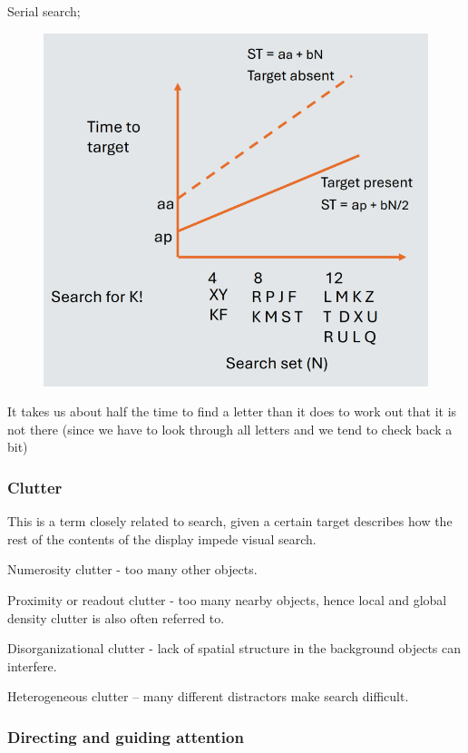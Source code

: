 \documentclass[]{project_plan}
\begin{document}
Serial search;
\begin{figure}[h!]
  \centering
  \includegraphics[width=\linewidth]{serial_search_absent_present_target.png}
\end{figure}

It takes us about half the time to find a letter than it does to work out
that it is not there (since we have to look through all letters and we
tend to check back a bit)

\subsubsection{Clutter}
This is a term closely related to search, given a certain target describes how
the rest of the contents of the display impede visual search.

Numerosity clutter - too many other objects.

Proximity or readout clutter - too many nearby objects, hence local and global
density clutter is also often referred to.

Disorganizational clutter - lack of spatial structure in the background objects
can interfere.

Heterogeneous clutter – many different distractors make search difficult.

\subsubsection{Directing and guiding attention}
\end{document}
